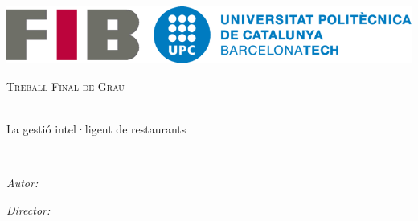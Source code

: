 \documentclass[
11pt, %
catalan,
english,
spanish,
singlespacing, %
headsepline, %
]{MastersDoctoralThesis} %
\date{\displaydate{date}}
\author{Albert Suàrez} %
\begin{document}

\frontmatter %

\pagestyle{plain} %


\begin{titlepage}
\begin{center}

\includegraphics[scale=0.25]{Figures/logo-upc.png} %

\vspace*{.06\textheight}
{\scshape\LARGE \univname\par}\vspace{1.5cm} %
\textsc{\Large Treball Final de Grau}\\[0.5cm] %

\HRule \\[0.4cm] %
{\Huge \bfseries \ttitle\par}\vspace{0.4cm} %
{\large La gestió intel·ligent de restaurants\par}\vspace{0.1cm} %
\HRule \\[1.5cm] %
 
\begin{minipage}[t]{0.4\textwidth}
\begin{flushleft} \large
\emph{Autor:}\\
\authorname %
\end{flushleft}
\end{minipage}
\begin{minipage}[t]{0.4\textwidth}
\begin{flushright} \large
\emph{Director:} \\
\supname %
\end{flushright}
\end{minipage}\\[3cm]
 

\end{center}
\end{titlepage}
\end{document}
